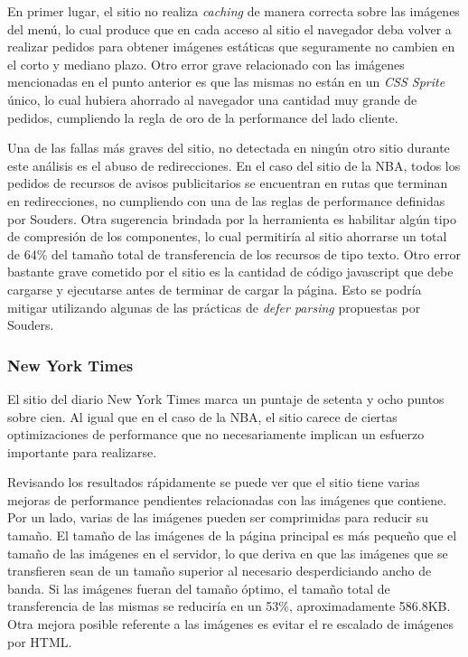En primer lugar, el sitio no realiza \emph{caching} de manera correcta sobre las imágenes del menú, lo cual produce que en cada acceso al sitio el navegador deba volver a realizar
pedidos para obtener imágenes estáticas que seguramente no cambien en el corto y mediano plazo. Otro error grave relacionado con las imágenes mencionadas en el punto anterior
es que las mismas no están en un \emph{CSS Sprite} único, lo cual hubiera ahorrado al navegador una cantidad muy grande de pedidos, cumpliendo la regla de oro de la performance del lado cliente.

Una de las fallas más graves del sitio, no detectada en ningún otro sitio durante este análisis es el abuso de redirecciones. En el caso del sitio de la NBA, todos los pedidos de
recursos de avisos publicitarios se encuentran en rutas que terminan en redirecciones, no cumpliendo con una de las reglas de performance definidas por Souders. Otra sugerencia
brindada por la herramienta es habilitar algún tipo de compresión de los componentes, lo cual permitiría al sitio ahorrarse un total de 64\% del tamaño total de transferencia de los
recursos de tipo texto. Otro error bastante grave cometido por el sitio es la cantidad de código javascript que debe cargarse y ejecutarse antes de terminar de cargar la página.
Esto se podría mitigar utilizando algunas de las prácticas de \emph{defer parsing} propuestas por Souders.

\subsubsection{New York Times}

El sitio del diario New York Times marca un puntaje de setenta y ocho puntos sobre cien. Al igual que en el caso de la NBA, el sitio carece de ciertas optimizaciones de performance
que no necesariamente implican un esfuerzo importante para realizarse.

Revisando los resultados rápidamente se puede ver que el sitio tiene varias mejoras de performance pendientes relacionadas con las imágenes que contiene. Por un lado, varias
de las imágenes pueden ser comprimidas para reducir su tamaño. El tamaño de las imágenes de la página principal es más pequeño que el tamaño de las imágenes en el servidor, lo que deriva en que las imágenes que se transfieren sean de un tamaño superior al necesario desperdiciando ancho de banda. Si las
imágenes fueran del tamaño óptimo, el tamaño total de transferencia de las mismas se reduciría en un 53\%, aproximadamente 586.8KB.
Otra mejora posible referente a las imágenes es evitar el re escalado de imágenes por HTML.

